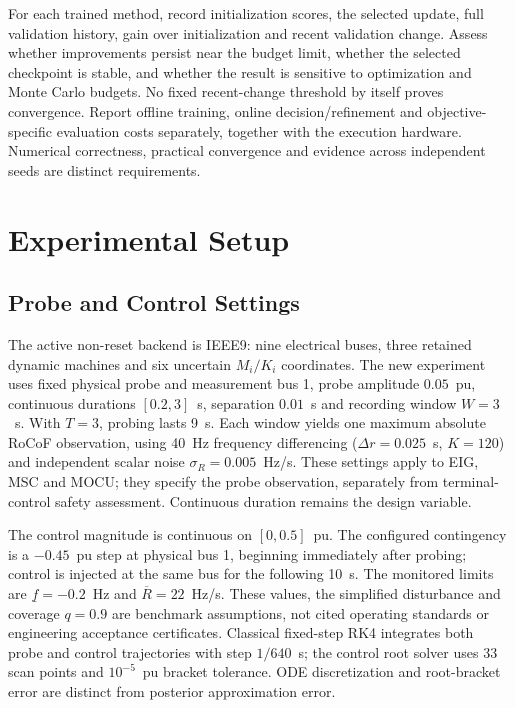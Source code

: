 \documentclass[journal]{IEEEtran}
\begin{document}
For each trained method, record initialization scores, the selected update,
full validation history, gain over initialization and recent validation change.
Assess whether improvements persist near the budget limit, whether the selected
checkpoint is stable, and whether the result is sensitive to optimization and
Monte Carlo budgets. No fixed recent-change threshold by itself proves
convergence. Report offline training, online decision/refinement and
objective-specific evaluation costs separately, together with the execution
hardware. Numerical correctness, practical convergence and evidence across
independent seeds are distinct requirements.

\section{Experimental Setup}
\label{sec:experimental-protocol}
\subsection{Probe and Control Settings}
The active non-reset backend is IEEE9: nine electrical buses, three retained
dynamic machines and six uncertain $M_i/K_i$ coordinates. The new experiment
uses fixed physical probe and measurement bus 1, probe amplitude $0.05$~pu,
continuous durations $[0.2,3]$~s, separation $0.01$~s and recording window
$W=3$~s. With $T=3$, probing lasts 9~s. Each window yields one maximum
absolute RoCoF observation, using 40~Hz frequency differencing
($\Delta r=0.025$~s, $K=120$) and independent scalar noise
$\sigma_R=0.005$~Hz/s. These settings apply to EIG, MSC and MOCU;
they specify the probe observation, separately from terminal-control safety
assessment. Continuous duration remains the design variable.

The control magnitude is continuous on $[0,0.5]$~pu. The configured contingency
is a $-0.45$~pu step at physical bus 1, beginning immediately after probing;
control is injected at the same bus for the following 10~s. The monitored
limits are $\underline f=-0.2$~Hz and $\overline R=22$~Hz/s. These values,
the simplified disturbance and coverage $q=0.9$ are benchmark assumptions,
not cited operating standards or engineering acceptance certificates.
Classical fixed-step RK4 integrates both probe and control trajectories with
step $1/640$~s; the control root solver uses 33 scan points and
$10^{-5}$~pu bracket tolerance. ODE discretization and root-bracket error
are distinct from posterior approximation error.
\end{document}
